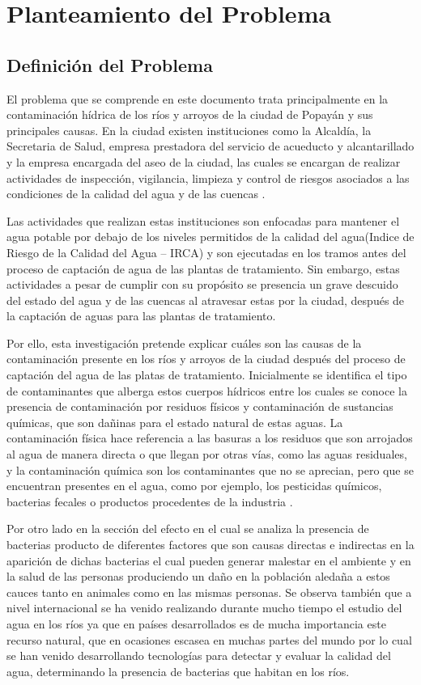 \section{Planteamiento del Problema}
\subsection{Definición del Problema}
El problema que se comprende en este documento trata principalmente en la contaminación hídrica de los ríos y arroyos de la ciudad de Popayán y sus principales causas. En la ciudad existen instituciones como la Alcaldía, la Secretaria de Salud, empresa prestadora del servicio de acueducto y alcantarillado y la empresa encargada del aseo de la ciudad, las cuales se encargan de realizar actividades de inspección, vigilancia, limpieza y control de riesgos asociados a las condiciones de la calidad del agua y de las cuencas \cite{SecretariadeSalud2019}.

Las actividades que realizan estas instituciones son enfocadas para mantener el agua potable por debajo de los niveles permitidos de la calidad del agua(Indice de Riesgo de la Calidad del Agua -- IRCA) y son ejecutadas en los tramos antes del proceso de captación de agua de las plantas de tratamiento. Sin embargo, estas actividades a pesar de cumplir con su propósito se presencia un grave descuido del estado del agua y de las cuencas al atravesar estas por la ciudad, después de la captación de aguas para las plantas de tratamiento.

Por ello, esta investigación pretende explicar cuáles son las causas de la contaminación presente en los ríos y arroyos de la ciudad después del proceso de captación del agua de las platas de tratamiento. Inicialmente se identifica el tipo de contaminantes que alberga estos cuerpos hídricos entre los cuales se conoce la presencia de contaminación por residuos físicos y contaminación de sustancias químicas, que son dañinas para el estado natural de estas aguas. La contaminación física hace referencia a las basuras  a los residuos que son arrojados al agua de manera directa o que llegan por otras vías, como las aguas residuales, y la contaminación química son los contaminantes que no se aprecian, pero que se encuentran presentes en el agua, como por ejemplo, los pesticidas químicos, bacterias fecales o productos procedentes de la industria \cite{tipocontaminacion}.



Por otro lado en la sección del efecto en el cual se analiza la presencia de bacterias producto de diferentes factores que son causas directas e indirectas en la aparición de dichas bacterias el cual pueden generar malestar en el ambiente y en la salud de las personas produciendo un daño en la población aledaña a estos cauces tanto en animales como en las mismas personas. Se observa también que a nivel internacional se ha venido realizando durante mucho tiempo el estudio del agua en los ríos ya que en países desarrollados es de mucha importancia este recurso natural, que en ocasiones escasea en muchas partes del mundo por lo cual se han venido desarrollando tecnologías para detectar y evaluar la calidad del agua, determinando la presencia de bacterias que habitan en los ríos.

